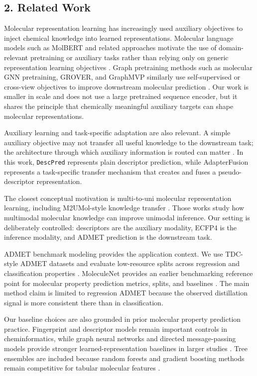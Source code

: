 \documentclass[
]{article}
\begin{document}
\subsection{2. Related Work}\label{related-work}

Molecular representation learning has increasingly used auxiliary
objectives to inject chemical knowledge into learned representations.
Molecular language models such as MolBERT and related approaches
motivate the use of domain-relevant pretraining or auxiliary tasks
rather than relying only on generic representation learning objectives
\citep{Fabian2020MolBERT}. Graph pretraining methods such as molecular
GNN pretraining, GROVER, and GraphMVP similarly use self-supervised or
cross-view objectives to improve downstream molecular prediction
\citep{Hu2020PretrainGNN, Rong2020GROVER, Liu2022GraphMVP}. Our work is
smaller in scale and does not use a large pretrained sequence encoder,
but it shares the principle that chemically meaningful auxiliary targets
can shape molecular representations.

Auxiliary learning and task-specific adaptation are also relevant. A
simple auxiliary objective may not transfer all useful knowledge to the
downstream task; the architecture through which auxiliary information is
routed can matter \citep{Ruder2017, Dey2024AuxAdapt}. In this work,
\texttt{DescPred} represents plain descriptor prediction, while
AdapterFusion represents a task-specific transfer mechanism that creates
and fuses a pseudo-descriptor representation.

The closest conceptual motivation is multi-to-uni molecular
representation learning, including M2UMol-style knowledge transfer
\citep{Xiong2026M2UMol}. Those works study how multimodal molecular
knowledge can improve unimodal inference. Our setting is deliberately
controlled: descriptors are the auxiliary modality, ECFP4 is the
inference modality, and ADMET prediction is the downstream task.

ADMET benchmark modeling provides the application context. We use
TDC-style ADMET datasets and evaluate low-resource splits across
regression and classification properties \citep{Huang2021TDC}.
MoleculeNet provides an earlier benchmarking reference point for
molecular property prediction metrics, splits, and baselines
\citep{Wu2018MoleculeNet}. The main method claim is limited to
regression ADMET because the observed distillation signal is more
consistent there than in classification.

Our baseline choices are also grounded in prior molecular property
prediction practice. Fingerprint and descriptor models remain important
controls in cheminformatics, while graph neural networks and directed
message-passing models provide stronger learned-representation baselines
in larger studies
\citep{Kearnes2016GraphConv, Yang2019DMPNN, Xiong2020AttentiveFP, Heid2024Chemprop}.
Tree ensembles are included because random forests and gradient boosting
methods remain competitive for tabular molecular features
\citep{Breiman2001, Chen2016XGBoost, Ke2017LightGBM, Tian2022ADMETBoost}.
\end{document}
